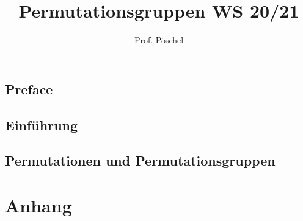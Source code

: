 \documentclass[ngerman,a4paper,order=firstname]{mathscript}
\title{\textbf{Permutationsgruppen WS 20/21}}
\author{Prof. Pöschel}
\begin{document}
\pagestyle{plain}

\maketitle

\hypertarget{tocpage}{}
\tableofcontents
{}

\pagebreak
{}
\pagestyle{fancy}

\chapter*{Preface}

\chapter{Einführung}

\chapter{Permutationen und Permutationsgruppen}


\part*{Anhang}
\appendix

\nocite{*}
%
%


\printindex
\end{document}
